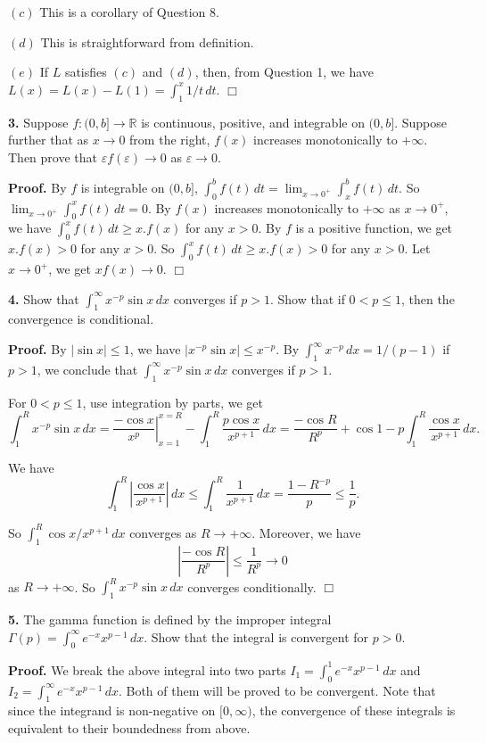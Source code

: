 \documentclass{article}
\begin{document}
$(c)$ This is a corollary of Question 8.

$(d)$ This is straightforward from definition.

$(e)$ If $L$ satisfies $(c)$ and $(d)$, then, from Question 1, we have
$L(x) = L(x) - L(1) = \int_1^x 1/t\,dt$. $\Box$

    \textbf{3.} Suppose $f : (0, b] \to \mathbb{R}$ is continuous, positive,
and integrable on $(0, b]$. Suppose further that as $x \to 0$ from the
right, $f (x)$ increases monotonically to $+\infty$. Then prove that
$\varepsilon f (\varepsilon) \to 0$ as $\varepsilon \to 0$.

    \textbf{Proof.} By $f$ is integrable on $(0,b]$,
$\int_0^b f(t)\,dt = \lim_{x\to 0^+}\int_x^b f(t)\,dt$. So
$\lim_{x\to 0^+} \int_0^x f(t)\,dt = 0$. By $f(x)$ increases
monotonically to $+\infty$ as $x\to 0^+$, we have
$\int_0^x f(t)\,dt \ge x.f(x)$ for any $x > 0$. By $f$ is a positive
function, we get $x.f(x) > 0$ for any $x > 0$. So
$\int_0^x f(t)\,dt \ge x.f(x) > 0$ for any $x > 0$. Let $x \to 0^+$, we
get $xf(x) \to 0$. $\Box$

    \textbf{4.} Show that $\int_1^{\infty} x^{-p}\sin x \, dx$ converges if
$p > 1$. Show that if $0 < p ≤ 1$, then the convergence is conditional.

    \textbf{Proof.} By $|\sin x | \le 1$, we have
$|x^{-p}\sin x| \le x^{-p}$. By $\int_1^{\infty} x^{-p}\,dx = 1/(p-1)$
if $p > 1$, we conclude that $\int_1^{\infty}x^{-p}\sin x \,dx$
converges if $p > 1$.

For $0 < p \le 1$, use integration by parts, we get
\[\int_1^R x^{-p}\sin x \,dx =\left. \frac{-\cos x}{x^p}\right|^{x=R}_{x= 1} - \int_1^R \frac{p\cos x}{x^{p+1}}\,dx= \frac{-\cos R}{R^p} + \cos 1 - p \int_1^R \frac{\cos x }{x^{p+1}}\,dx.\]

We have
\[\int_1^R \left|\frac{\cos x}{x^{p+1}}\right|\,dx \le \int_1^R \frac{1}{x^{p+1}}\, dx = \frac{1-R^{-p}}{p} \le \frac{1}{p}.\]

So $\int_1^R \cos x /x^{p+1}\,dx$ converges as $R\to +\infty$. Moreover,
we have \[\left | \frac{-\cos R}{R^p} \right | \le \frac{1}{R^p} \to 0\]
as $R \to +\infty$. So $\int_1^R x^{-p}\sin x \,dx$ converges
conditionally. $\Box$

    \textbf{5.} The gamma function is defined by the improper integral
$\Gamma (p) = \int_0^{\infty} e^{-x} x^{p-1} \,dx$. Show that the
integral is convergent for $p > 0$.

    \textbf{Proof.} We break the above integral into two parts
$I_1 = \int_0^{1} e^{-x} x^{p-1} \,dx$ and
$I_2 = \int_1^{\infty} e^{-x} x^{p-1} \,dx$. Both of them will be proved
to be convergent. Note that since the integrand is non-negative on
$[0, \infty)$, the convergence of these integrals is equivalent to their
boundedness from above.
\end{document}
